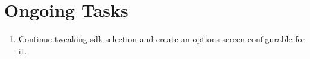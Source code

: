 \documentclass{article}[10pt]
\begin{document}
\section{Ongoing Tasks}

\begin{enumerate}
\item Continue tweaking sdk selection and create an options screen configurable for it.
\end{enumerate}
\end{document}
